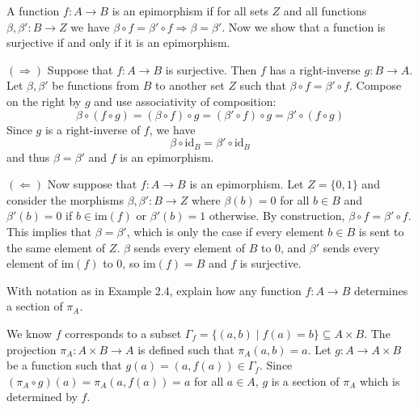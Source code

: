 \documentclass[../../master.tex]{subfiles}
\begin{document}
  \begin{solution}
    A function \(f: A \to B\) is an epimorphism if for all sets \(Z\) and all functions \(\beta, \beta': B \to Z\) we have \(\beta \circ f = \beta' \circ f \Longrightarrow \beta = \beta'\).
    Now we show that a function is surjective if and only if it is an epimorphism.

    \((\Longrightarrow)\) Suppose that \(f: A \to B \) is surjective. Then \(f\) has a right-inverse \(g: B \to A\).
    Let \(\beta, \beta'\) be functions from \(B\) to another set \(Z\) such that \(\beta \circ f = \beta' \circ f\).
    Compose on the right by \(g\) and use associativity of composition:
    \begin{equation*}
      \beta \circ (f \circ g) = (\beta \circ f) \circ g = (\beta' \circ f) \circ g = \beta' \circ (f \circ g)
    \end{equation*}
    Since \(g\) is a right-inverse of \(f\), we have
    \begin{equation*}
      \beta \circ \text{id}_{B} = \beta' \circ \text{id}_{B}
    \end{equation*}
    and thus \(\beta = \beta'\) and \(f\) is an epimorphism.

    \((\Longleftarrow)\) Now suppose that \(f: A \to B\) is an epimorphism.
    Let \(Z = \{0, 1\}\) and consider the morphisms \(\beta, \beta': B \to Z\) where \(\beta(b) = 0\) for all \(b \in B\) and \(\beta'(b) = 0\) if \(b \in \text{im}(f)\) or \(\beta'(b) = 1\) otherwise.
    By construction, \(\beta \circ f = \beta' \circ f\). This implies that \(\beta = \beta'\),
    which is only the case if every element \(b \in B\) is sent to the same element of \(Z\).
    \(\beta\) sends every element of \(B\) to 0, and \(\beta'\) sends every element of \(\text{im}(f)\) to 0, so \(\text{im}(f) = B\) and \(f\) is surjective.
  \end{solution}

  \begin{problem}
    With notation as in Example 2.4, explain how any function \(f: A \to B\) determines a section of \(\pi_{A}\).
  \end{problem}

  \begin{solution}
    We know \(f\) corresponds to a subset \(\Gamma_{f} = \{(a, b) \mid f(a) = b\} \subseteq A \times B\).
    The projection \(\pi_{A}: A \times B \to A\) is defined such that \(\pi_{A} (a, b) = a\).
    Let \(g: A \to A \times B\) be a function such that \(g(a) = (a, f(a)) \in \Gamma_{f}\).
    Since \((\pi_{A} \circ g) (a) = \pi_{A}(a, f(a)) = a\) for all \(a \in A\), \(g\) is a section of \(\pi_{A}\) which is determined by \(f\).
  \end{solution}
\end{document}
